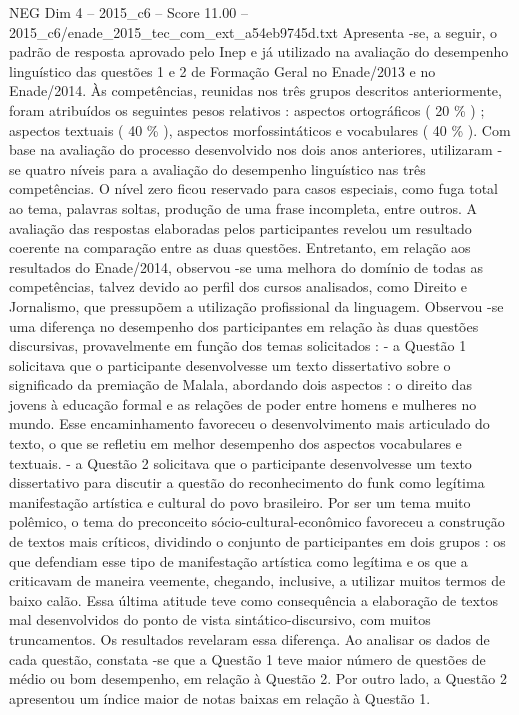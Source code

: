 \begin{textsample}{NEG Dim 4 – 2015\_c6 – Score 11.00 – 2015\_c6/enade\_2015\_tec\_com\_ext\_a54eb9745d.txt}
Apresenta -se, a seguir, o padrão de resposta aprovado pelo Inep e já utilizado na avaliação do desempenho linguístico das questões 1 e 2 de Formação Geral no Enade/2013 e no Enade/2014.
Às competências, reunidas nos três grupos descritos anteriormente, foram atribuídos os seguintes pesos relativos : aspectos ortográficos ( 20 \% ) ; aspectos textuais ( 40 \% ), aspectos morfossintáticos e vocabulares ( 40 \% ).
Com base na avaliação do processo desenvolvido nos dois anos anteriores, utilizaram -se quatro níveis para a avaliação do desempenho linguístico nas três competências.
O nível zero ficou reservado para casos especiais, como fuga total ao tema, palavras soltas, produção de uma frase incompleta, entre outros.
A avaliação das respostas elaboradas pelos participantes revelou um resultado coerente na comparação entre as duas questões.
Entretanto, em relação aos resultados do Enade/2014, observou -se uma melhora do domínio de todas as competências, talvez devido ao perfil dos cursos analisados, como Direito e Jornalismo, que pressupõem a utilização profissional da linguagem.
Observou -se uma diferença no desempenho dos participantes em relação às duas questões discursivas, provavelmente em função dos temas solicitados : - a Questão 1 solicitava que o participante desenvolvesse um texto dissertativo sobre o significado da premiação de Malala, abordando dois aspectos : o direito das jovens à educação formal e as relações de poder entre homens e mulheres no mundo.
Esse encaminhamento favoreceu o desenvolvimento mais articulado do texto, o que se refletiu em melhor desempenho dos aspectos vocabulares e textuais. - a Questão 2 solicitava que o participante desenvolvesse um texto dissertativo para discutir a questão do reconhecimento do funk como legítima manifestação artística e cultural do povo brasileiro.
Por ser um tema muito polêmico, o tema do preconceito sócio-cultural-econômico favoreceu a construção de textos mais críticos, dividindo o conjunto de participantes em dois grupos : os que defendiam esse tipo de manifestação artística como legítima e os que a criticavam de maneira veemente, chegando, inclusive, a utilizar muitos termos de baixo calão.
Essa última atitude teve como consequência a elaboração de textos mal desenvolvidos do ponto de vista sintático-discursivo, com muitos truncamentos.
Os resultados revelaram essa diferença.
Ao analisar os dados de cada questão, constata -se que a Questão 1 teve maior número de questões de médio ou bom desempenho, em relação à Questão 2.
Por outro lado, a Questão 2 apresentou um índice maior de notas baixas em relação à Questão 1.

\end{textsample}
